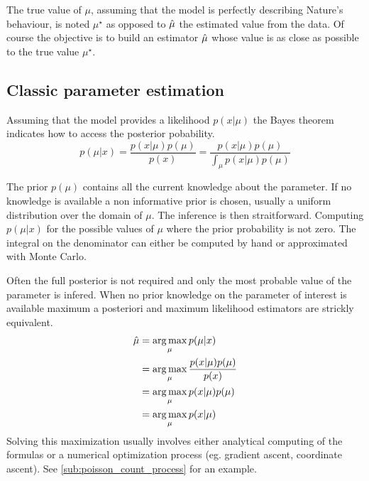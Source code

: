 The true value of $\mu$, assuming that the model is perfectly describing Nature's behaviour, is noted $\mu^\star$ as opposed to $\hat\mu$ the estimated value from the data.
Of course the objective is to build an estimator $\hat\mu$ whose value is as close as possible to the true value $\mu^\star$.







\subsection{Classic parameter estimation} %
\label{sub:classic_parameter_estimation}



Assuming that the model provides a likelihood $p(x | \mu)$ the Bayes theorem indicates how to access the posterior pobability.
\begin{equation}	
    p(\mu | x) = \frac{p(x|\mu) p(\mu)}{p(x)} = \frac{p(x|\mu) p(\mu)}{\int_\mu p(x|\mu) p(\mu)}
\end{equation}

The prior $p(\mu)$ contains all the current knowledge about the parameter. 
If no knowledge is available a non informative prior is chosen, usually a uniform distribution over the domain of $\mu$.
The inference is then straitforward.
Computing $p(\mu | x)$ for the possible values of $\mu$ \ie where the prior probability is not zero.
The integral on the denominator can either be computed by hand or approximated with Monte Carlo.

Often the full posterior is not required and only the most probable value of the parameter is infered.
When no prior knowledge on the parameter of interest is available maximum a posteriori and maximum likelihood estimators are strickly equivalent.
\begin{align}
	\hat\mu &= \operatorname*{arg\,max}_\mu p(\mu | x) \\
							&= \operatorname*{arg\,max}_\mu \frac{p(x|\mu) p(\mu)}{p(x)} \\
							&= \operatorname*{arg\,max}_\mu p(x|\mu) p(\mu) \\
							&= \operatorname*{arg\,max}_\mu p(x|\mu)\\
\end{align}
Solving this maximization usually involves either analytical computing of the formulas  or a numerical optimization process (eg. gradient ascent, coordinate ascent).
See \autoref{sub:poisson_count_process} for an example.








